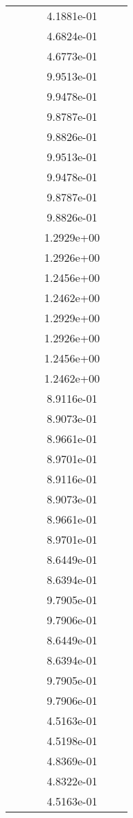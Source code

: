 \begin{xltabular}{\textwidth}{r|rS[table-format=1.3e+2]S[table-format=1.4e+2]S[table-format=1.4e+2]S[table-format=-1.5]}
&  &  & 4.1881e-01 & & \\
&  &  & 4.6824e-01 & & \\
&  &  & 4.6773e-01 & & \\
&  &  & 9.9513e-01 & & \\
&  &  & 9.9478e-01 & & \\
&  &  & 9.8787e-01 & & \\
&  &  & 9.8826e-01 & & \\
&  &  & 9.9513e-01 & & \\
&  &  & 9.9478e-01 & & \\
&  &  & 9.8787e-01 & & \\
&  &  & 9.8826e-01 & & \\
&  &  & 1.2929e+00 & & \\
&  &  & 1.2926e+00 & & \\
&  &  & 1.2456e+00 & & \\
&  &  & 1.2462e+00 & & \\
&  &  & 1.2929e+00 & & \\
&  &  & 1.2926e+00 & & \\
&  &  & 1.2456e+00 & & \\
&  &  & 1.2462e+00 & & \\
&  &  & 8.9116e-01 & & \\
&  &  & 8.9073e-01 & & \\
&  &  & 8.9661e-01 & & \\
&  &  & 8.9701e-01 & & \\
&  &  & 8.9116e-01 & & \\
&  &  & 8.9073e-01 & & \\
&  &  & 8.9661e-01 & & \\
&  &  & 8.9701e-01 & & \\
&  &  & 8.6449e-01 & & \\
&  &  & 8.6394e-01 & & \\
&  &  & 9.7905e-01 & & \\
&  &  & 9.7906e-01 & & \\
&  &  & 8.6449e-01 & & \\
&  &  & 8.6394e-01 & & \\
&  &  & 9.7905e-01 & & \\
&  &  & 9.7906e-01 & & \\
&  &  & 4.5163e-01 & & \\
&  &  & 4.5198e-01 & & \\
&  &  & 4.8369e-01 & & \\
&  &  & 4.8322e-01 & & \\
&  &  & 4.5163e-01 & & \\

\end{xltabular}

